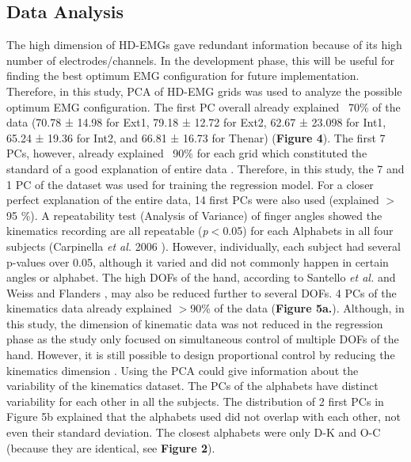 \documentclass[conference]{IEEEtran}
\begin{document}
\subsection{Data Analysis}
The high dimension of HD-EMGs gave redundant information because of its high number of 
electrodes/channels. In the development phase, this will be useful for finding the best optimum EMG
configuration for future implementation. Therefore, in this study, PCA of HD-EMG grids was used to 
analyze the possible optimum EMG configuration. The first PC overall already explained ~70\% of the data 
(70.78 ± 14.98 for Ext1, 79.18 ± 12.72 for Ext2, 62.67 ± 23.098 for Int1, 65.24 ± 19.36 for Int2, and 66.81 
± 16.73 for Thenar) (\textbf{Figure 4}). The first 7 PCs, however, already explained ~90\% for each grid which 
constituted the standard of a good explanation of entire data \cite{b9}\cite{b23}. Therefore, in this study, the 7 and 1 
PC of the dataset was used for training the regression model. For a closer perfect explanation of the entire data, 
14 first PCs were also used (explained $>$95 \%).
A repeatability test (Analysis of Variance) of finger angles showed the kinematics recording are all 
repeatable (\textit{p}$<$0.05) for each Alphabets in all four subjects (Carpinella \textit{et al.} 2006 \cite{b25}). However, 
individually, each subject had several p-values over 0.05, although it varied and did not commonly happen 
in certain angles or alphabet.
The high DOFs of the hand, according to Santello \textit{et al.} \cite{b32} and Weiss and Flanders \cite{b28}, may also be 
reduced further to several DOFs. 4 PCs of the kinematics data already explained $>$90\% of the data (\textbf{Figure 5a.}). Although, in this study, the dimension of kinematic data was not reduced in the regression phase as the 
study only focused on simultaneous control of multiple DOFs of the hand. However, it is still possible to
design proportional control by reducing the kinematics dimension \cite{b36}.
Using the PCA could give information about the variability of the kinematics dataset. The PCs of the
alphabets have distinct variability for each other in all the subjects. The distribution of 2 first PCs in Figure 
5b explained that the alphabets used did not overlap with each other, not even their standard deviation. The 
closest alphabets were only D-K and O-C (because they are identical, see \textbf{Figure 2}).
\end{document}
